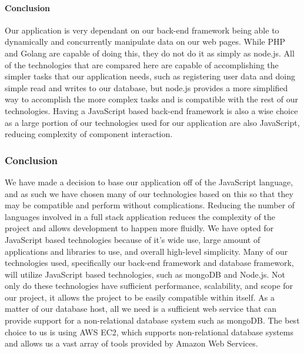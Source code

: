 	\paragraph{Conclusion}
	
		Our application is very dependant on our back-end framework being able to dynamically and concurrently manipulate data on our web pages. 
		While PHP and Golang are capable of doing this, they do not do it as simply as node.js. All of the technologies that are compared here are
		capable of accomplishing the simpler tasks that our application needs, such as registering user data and doing simple read and writes to our database,
		but node.js provides a more simplified way to accomplish the more complex tasks and is compatible with the rest of our technologies. Having a JavaScript
		based back-end framework is also a wise choice as a large portion of our technologies used for our application are also JavaScript, reducing complexity of component interaction. 
	
\subsubsection{Conclusion}

	We have made a decision to base our application off of the JavaScript language, and as such we have chosen many of our technologies based on this
	so that they may be compatible and perform without complications. Reducing the number of languages involved in a full stack application reduces the complexity of
	the project and allows development to happen more fluidly. We have opted for JavaScript based technologies because of it's wide use, large amount of
	applications and libraries to use, and overall high-level simplicity. Many of our technologies used, specifically our back-end framework and database framework, 
	will utilize JavaScript based technologies, such as mongoDB and Node.js. Not only do these technologies have sufficient performance, scalability, and scope for our project, it allows the 
	project to be easily compatible within itself. As a matter of our database host, all we need is a sufficient web service that can provide support for a 
	non-relational database system such as mongoDB. The best choice to us is using AWS EC2, which supports non-relational database systems 
	and allows us a vast array of tools provided by Amazon Web Services. 


	







